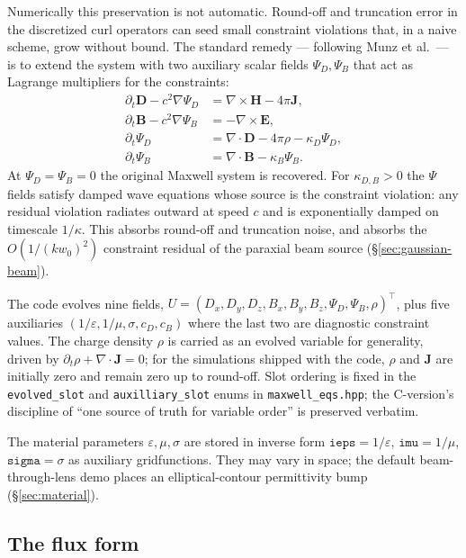 \documentclass[11pt]{article}
\newcommand{\vE}{\mathbf{E}}
\newcommand{\vB}{\mathbf{B}}
\newcommand{\vD}{\mathbf{D}}
\newcommand{\vH}{\mathbf{H}}
\newcommand{\vJ}{\mathbf{J}}
\newcommand{\eps}{\varepsilon}
\begin{document}
Numerically this preservation is not automatic.  Round-off and
truncation error in the discretized curl operators can seed small
constraint violations that, in a naive scheme, grow without bound.
The standard remedy --- following Munz et al.\ --- is to extend the
system with two auxiliary scalar fields $\Psi_D, \Psi_B$ that act as
Lagrange multipliers for the constraints:
\begin{align}
  \partial_t \vD - c^2 \nabla \Psi_D
                 &= \nabla \times \vH - 4\pi \vJ, \\
  \partial_t \vB - c^2 \nabla \Psi_B
                 &= -\nabla \times \vE, \\
  \partial_t \Psi_D &= \nabla \cdot \vD - 4\pi \rho - \kappa_D \Psi_D, \\
  \partial_t \Psi_B &= \nabla \cdot \vB - \kappa_B \Psi_B.
\end{align}
At $\Psi_D = \Psi_B = 0$ the original Maxwell system is recovered.
For $\kappa_{D,B} > 0$ the $\Psi$ fields satisfy damped wave
equations whose source is the constraint violation: any residual
violation radiates outward at speed $c$ and is exponentially damped
on timescale $1/\kappa$.  This absorbs round-off and truncation
noise, and absorbs the $O(1/(kw_0)^2)$ constraint residual of the
paraxial beam source (\S\ref{sec:gaussian-beam}).

The code evolves nine fields,
$U = (D_x, D_y, D_z, B_x, B_y, B_z, \Psi_D, \Psi_B, \rho)^\top$,
plus five auxiliaries $(1/\eps, 1/\mu, \sigma, c_D, c_B)$ where the
last two are diagnostic constraint values.  The charge density
$\rho$ is carried as an evolved variable for generality, driven by
$\partial_t \rho + \nabla \cdot \vJ = 0$; for the simulations
shipped with the code, $\rho$ and $\vJ$ are initially zero and
remain zero up to round-off.  Slot ordering is fixed in the
\texttt{evolved\_slot} and \texttt{auxilliary\_slot} enums in
\texttt{maxwell\_eqs.hpp}; the C-version's discipline of ``one
source of truth for variable order'' is preserved verbatim.

The material parameters $\eps, \mu, \sigma$ are stored in inverse
form $\mathtt{ieps} = 1/\eps$, $\mathtt{imu} = 1/\mu$,
$\mathtt{sigma} = \sigma$ as auxiliary gridfunctions.  They may
vary in space; the default beam-through-lens demo places an
elliptical-contour permittivity bump (\S\ref{sec:material}).

\subsection{The flux form}
\end{document}
